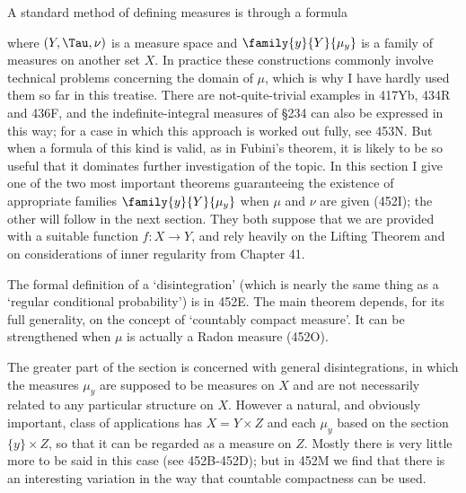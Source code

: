 
\def\chaptername{Perfect measures, disintegrations and processes}
\def\sectionname{Integration and disintegration of measures}

\def\undtheta{\underline{\theta}}
\def\undphi{\underline{\phi}}
\def\undpsi{\underline{\psi}}


A standard method of defining measures is through a formula


\noindent where $(Y,\Tau,\nu)$ is a measure space and
$\family{y}{Y}{\mu_y}$ is a family of measures on another set $X$.   In
practice these constructions commonly involve technical problems
concerning the domain of $\mu$, which is why I
have hardly used them so
far in this treatise.   There are not-quite-trivial examples in 417Yb,
434R and 436F, and the indefinite-integral measures of \S234 can also be
expressed in this way;  for a case in which this
approach is worked out fully, see 453N.
But when a formula of this kind is valid, as in Fubini's
theorem, it is likely to be so useful that it dominates
further investigation of the topic.   In this section I give one of the
two most important theorems guaranteeing the existence of appropriate
families $\family{y}{Y}{\mu_y}$ when $\mu$ and $\nu$ are given (452I);
the other will follow in the next section.   They
both suppose that we are provided with a suitable function $f:X\to Y$,
and rely heavily on the Lifting Theorem and on
considerations of inner regularity from Chapter 41.

The formal definition of a `disintegration' (which is nearly the same
thing as a `regular conditional probability') is in 452E.   The main
theorem depends, for its full generality, on the concept of `countably
compact measure'.   It can be strengthened when $\mu$
is actually a Radon measure (452O).

The greater part of the section is concerned with general
disintegrations, in which the measures $\mu_y$ are supposed to be
measures on $X$ and are not necessarily
related to any particular structure on $X$.   However a natural,
and obviously important, class of applications has $X=Y\times Z$ and
each $\mu_y$ based on
the section $\{y\}\times Z$, so that it can be regarded as a measure on
$Z$.   Mostly there is very little more to be said in this case (see
452B-452D);  %
but in 452M we find that there is an interesting variation in the way that
countable compactness can be used.

